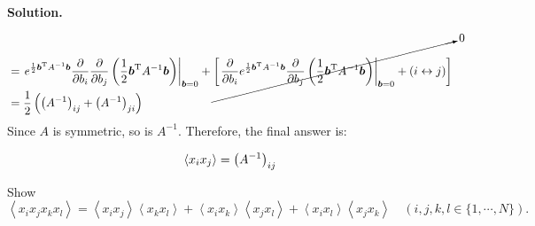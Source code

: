 \documentclass[11pt,a4paper]{article}
\newcounter{problem}
\newcounter{saveequation}
\newenvironment{solution}
{
	\par
	\setcounter{saveequation}{\value{equation}}
	\begingroup
	\setcounter{equation}{0}
	\renewcommand{\theequation}{\arabic{problem}.\arabic{equation}}
	\renewcommand{\theHequation}{sol.\arabic{problem}.\arabic{equation}}
	\noindent\textbf{Solution.}\quad
}
{
	\par
	\endgroup
	\setcounter{equation}{\value{saveequation}}
}
\begin{document}
\begin{solution}
\begin{equation}
\begin{aligned}
			& =\left.e^{\frac12 \boldsymbol{b}^\mathrm{T} A^{-1} \boldsymbol{b}}\frac{\partial}{\partial b_i}\frac{\partial}{\partial b_j} \left({\frac12 \boldsymbol{b}^\mathrm{T} A^{-1} \boldsymbol{b}}\right)\right|_{\boldsymbol{b}=0}+
			\cancelto{0}{\left[\left.\frac{\partial}{\partial b_i}e^{\frac12 \boldsymbol{b}^\mathrm{T} A^{-1} \boldsymbol{b}}\frac{\partial}{\partial b_j} \left({\frac12 \boldsymbol{b}^\mathrm{T} A^{-1} \boldsymbol{b}}\right)\right|_{\boldsymbol{b}=0}+(i\leftrightarrow j)\right]}\\
			&= \frac{1}{2}\left(\left(A^{-1}\right)_{ij}+\left(A^{-1}\right)_{ji}\right)
		\end{aligned}
	\end{equation}
	Since $A$ is symmetric, so is $A^{-1}$. Therefore, the final answer is:
	\begin{finalanswer}
		\begin{equation}
		\label{fin:3}
		\braket{x_ix_j}=\left(A^{-1}\right)_{ij}
		\end{equation}
	\end{finalanswer}
	\end{solution}
	\begin{problembox}
		Show
		\begin{equation}
			\left\langle x_i x_j x_k x_l \right\rangle
			= \left\langle x_i x_j \right\rangle \left\langle x_k x_l \right\rangle
			+ \left\langle x_i x_k \right\rangle \left\langle x_j x_l \right\rangle
			+ \left\langle x_i x_l \right\rangle \left\langle x_j x_k \right\rangle
			\quad (i,j,k,l\in\{1,\cdots,N\}).
		\end{equation}
	\end{problembox}
\end{document}
